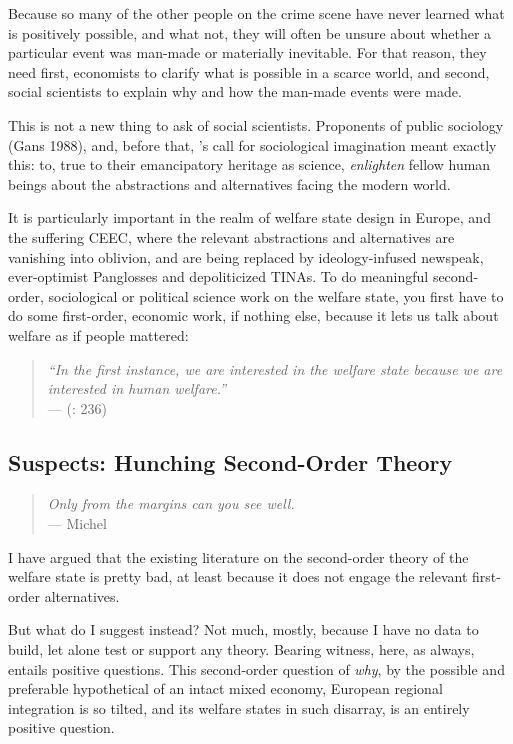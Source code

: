 \documentclass[11pt,a4paper,oneside,openright]{article}
\begin{document}
Because so many of the other people on the crime scene have never learned what is positively possible, and what not, they will often be unsure about whether a particular event was man-made or materially inevitable. For that reason, they need first, economists to clarify what is possible in a scarce world, and second, social scientists to explain why and how the man-made events were made.

This is not a new thing to ask of social scientists. Proponents of public sociology (Gans 1988), and, before that, \citeauthor{Mills-1959-aa}'s call for sociological imagination meant exactly this: to, true to their emancipatory heritage as science, \emph{enlighten} fellow human beings about the abstractions and alternatives facing the modern world.

It is particularly important in the realm of welfare state design in Europe, and the suffering \gls{CEEC}, where the relevant abstractions and alternatives are vanishing into oblivion, and are being replaced by ideology-infused newspeak, ever-optimist Panglosses and depoliticized TINAs. To do meaningful second-order, sociological or political science work on the welfare state, you first have to do some first-order, economic work, if nothing else, because it lets us talk about welfare as if people mattered:
\begin{quote}
	\emph{``In the first instance, we are interested in the welfare state because we are interested in human welfare.''}\\
	--- \citeauthor{Haggard2009} (\citeyear{Haggard2009}: 236) 
\end{quote}

\subsection[Suspects]{Suspects: Hunching Second-Order Theory}

\begin{quote}
	\emph{Only from the margins can you see well.}\\
	--- Michel \cite{Foucault-1972-aa} 
\end{quote}

I have argued that the existing literature on the second-order theory of the welfare state is pretty bad, at least because it does not engage the relevant first-order alternatives. 

But what do I suggest instead? Not much, mostly, because I have no data to build, let alone test or support any theory. Bearing witness, here, as always, entails positive questions. This second-order question of \emph{why}, by the possible and preferable hypothetical of an intact mixed economy, European regional integration is so tilted, and its welfare states in such disarray, is an entirely positive question.
\end{document}
